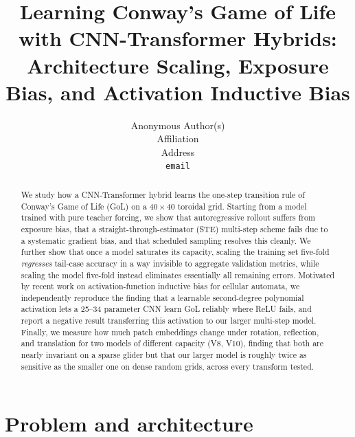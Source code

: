 \documentclass{article}
\title{Learning Conway's Game of Life with CNN-Transformer Hybrids:\\
Architecture Scaling, Exposure Bias, and Activation Inductive Bias}
\author{%
  Anonymous Author(s) \\
  Affiliation \\
  Address \\
  \texttt{email}
}
\begin{document}
\maketitle

\begin{abstract}
We study how a CNN-Transformer hybrid learns the one-step transition rule
of Conway's Game of Life (GoL) on a $40\times40$ toroidal grid. Starting
from a model trained with pure teacher forcing, we show that
autoregressive rollout suffers from exposure bias, that a
straight-through-estimator (STE) multi-step scheme fails due to a
systematic gradient bias, and that scheduled sampling resolves this
cleanly. We further show that once a model saturates its capacity,
scaling the training set five-fold \emph{regresses} tail-case accuracy in
a way invisible to aggregate validation metrics, while scaling the model
five-fold instead eliminates essentially all remaining errors. Motivated
by recent work on activation-function inductive bias for cellular
automata, we independently reproduce the finding that a learnable
second-degree polynomial activation lets a 25--34 parameter CNN learn GoL
reliably where ReLU fails, and report a negative result transferring this
activation to our larger multi-step model. Finally, we measure how much
patch embeddings change under rotation, reflection, and translation for
two models of different capacity (V8, V10), finding that both are nearly
invariant on a sparse glider but that our larger model is roughly twice
as sensitive as the smaller one on dense random grids, across every
transform tested.
\end{abstract}

\section{Problem and architecture}
\label{sec:arch}
\end{document}
